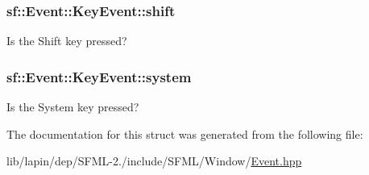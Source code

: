 \hypertarget{structsf_1_1_event_1_1_key_event_a776af1a3ca79abeeec18ebf1c0065aa9}{
\subsubsection[{shift}]{ sf\-::\-Event\-::\-Key\-Event\-::shift}}\label{structsf_1_1_event_1_1_key_event_a776af1a3ca79abeeec18ebf1c0065aa9}


Is the Shift key pressed? 

\hypertarget{structsf_1_1_event_1_1_key_event_ac0557f7edc2a608ec65175fdd843afc5}{
\subsubsection[{system}]{ sf\-::\-Event\-::\-Key\-Event\-::system}}\label{structsf_1_1_event_1_1_key_event_ac0557f7edc2a608ec65175fdd843afc5}


Is the System key pressed? 



The documentation for this struct was generated from the following file\-:\begin{DoxyCompactItemize}
\item 
lib/lapin/dep/\-S\-F\-M\-L-\/2./include/\-S\-F\-M\-L/\-Window/\hyperlink{lib_2lapin_2dep_2_s_f_m_l-2_83_2include_2_s_f_m_l_2_window_2_event_8hpp}{Event.\-hpp}\end{DoxyCompactItemize}
